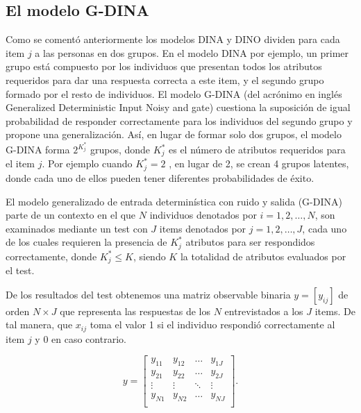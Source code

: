 			\subsection{El modelo G-DINA} \label{sec:GDINA}
				Como se coment\'{o} anteriormente los modelos DINA y DINO dividen para cada item $j$ a las personas en dos grupos. En el modelo DINA por ejemplo, un primer grupo est\'{a} compuesto por los individuos que presentan todos los atributos requeridos para dar una respuesta correcta a este item, y el segundo grupo formado por el resto de individuos.
				El modelo G-DINA (del acr\'{o}nimo en ingl\'{e}s Generalized Deterministic Input Noisy and gate) cuestiona la suposici\'{o}n de igual probabilidad de responder correctamente para los individuos del segundo grupo y propone una generalizaci\'{o}n. As\'{i}, en lugar de formar solo dos grupos, el modelo G-DINA forma ${ 2 }^{ { K }_{ j }^{ * } }$ grupos, donde $K_{j}^{*}$ es el n\'{u}mero de atributos requeridos para el item $j$. Por ejemplo cuando $K_{j}^{ * } =2$ , en lugar de 2, se crean 4 grupos latentes, donde cada uno de ellos pueden tener diferentes probabilidades de \'{e}xito.
				
				El modelo generalizado de entrada determin\'{i}stica con ruido y salida (G-DINA) parte de un contexto en el que $N$ individuos denotados por $i = 1,2,\ldots ,N$, son examinados mediante un test con $J$ items denotados por $j = 1, 2,\ldots ,J$, cada uno de los cuales requieren la presencia de ${ K }^{*}_{ j }$ atributos para ser respondidos correctamente, donde ${K}_{j}^{*}\le K$, siendo $K$ la totalidad de atributos evaluados por el test.
				
				De los resultados del test obtenemos una matriz observable binaria ${y}=\left[ {y}_{ij} \right]$  de orden $N\times J$ que representa las respuestas de los $N$ entrevistados a los $J$ items. De tal manera, que ${x}_{ij}$ toma el valor 1 si el individuo respondi\'{o} correctamente al item $j$ y 0 en caso contrario.
				
				\begin{equation} 
					y = \left[ \begin{array}{cccc} 
					y_{11} & y_{12} & \ldots & y_{1J} \\  
					y_{21} & y_{22} & \ldots & y_{2J} \\    
					\vdots & \vdots & \ddots & \vdots \\
					y_{N1} & y_{N2} & \ldots & y_{NJ} \\    
					\end{array} \right].\label{2.35}
				\end{equation}
				
